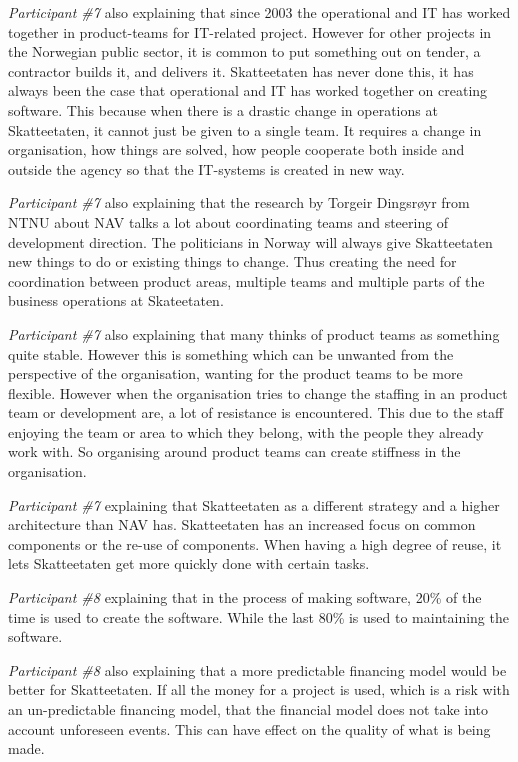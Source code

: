 \textit{Participant \#7} also explaining that since 2003 the operational and IT has worked together in product-teams for IT-related project. However for other projects in the Norwegian public sector, it is common to put something out on tender, a contractor builds it, and delivers it. Skatteetaten has never done this, it has always been the case that operational and IT has worked together on creating software. This because when there is a drastic change in operations at Skatteetaten, it cannot just be given to a single team. It requires a change in organisation, how things are solved, how people cooperate both inside and outside the agency so that the IT-systems is created in new way.

\textit{Participant \#7} also explaining that the research by Torgeir Dingsrøyr from NTNU about NAV talks a lot about coordinating teams and steering of development direction. The politicians in Norway will always give Skatteetaten new things to do or existing things to change. Thus creating the need for coordination between product areas, multiple teams and multiple parts of the business operations at Skateetaten.

\textit{Participant \#7} also explaining that many thinks of product teams as something quite stable. However this is something which can be unwanted from the perspective of the organisation, wanting for the product teams to be more flexible. However when the organisation tries to change the staffing in an product team or development are, a lot of resistance is encountered. This due to the staff enjoying the team or area to which they belong, with the people they already work with. So organising around product teams can create stiffness in the organisation.

\textit{Participant \#7} explaining that Skatteetaten as a different strategy and a higher architecture than NAV has. Skatteetaten has an increased focus on common components or the re-use of components. When having a high degree of reuse, it lets Skatteetaten get more quickly done with certain tasks.

\textit{Participant \#8} explaining that in the process of making software, 20\% of the time is used to create the software. While the last 80\% is used to maintaining the software.

\textit{Participant \#8} also explaining that a more predictable financing model would be better for Skatteetaten. If all the money for a project is used, which is a risk with an un-predictable financing model, that the financial model does not take into account unforeseen events. This can have effect on the quality of what is being made.

